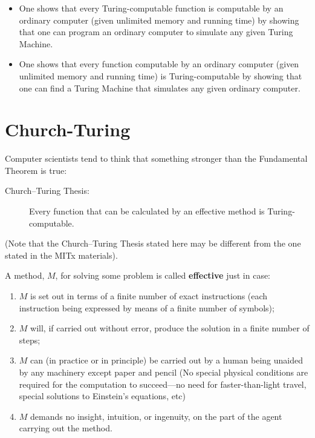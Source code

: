 \documentclass[12pt]{extarticle}
\begin{document}
\begin{itemize}
\item  One shows that every Turing-computable function is computable by an ordinary computer (given unlimited memory and running time) by showing that one can program an ordinary computer to simulate any given Turing Machine.
\item  One shows that every function computable by an ordinary computer (given unlimited memory and running time) is Turing-computable by showing that one can find a Turing Machine that simulates any given ordinary computer.
\end{itemize}









\section{Church-Turing}
Computer scientists tend to think that something stronger than the Fundamental Theorem is true:

\begin{description}
\item[Church--Turing Thesis:] Every function that can be calculated by an effective method is Turing-computable.
\end{description}
(Note that the Church--Turing Thesis stated here may be different from the one stated in the MITx materials).

A method, $M$, for solving some problem is called \textbf{effective} just in case:


\begin{enumerate}%
\item $M$ is set out in terms of a finite number of exact instructions (each instruction being expressed by means of a finite number of symbols);
\item $M$ will, if carried out without error, produce the solution in a finite number of steps;
\item $M$ can (in practice or in principle) be carried out by a human being unaided by any machinery except paper and pencil (No special physical conditions are required for the computation to succeed---no need for faster-than-light travel, special solutions to Einstein's equations, etc)
\item $M$ demands no insight, intuition, or ingenuity, on the part of the agent carrying out the method.
\end{enumerate}
\end{document}
